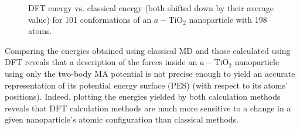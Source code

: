 \documentclass[aps,prb,twocolumn,amsmath,amssymb,superscriptaddress,longbibliography]{revtex4-1}
\newcommand\tab[1][1cm]{\hspace*{#1}} %
\begin{document}
\begin{figure}[htb]
\caption{DFT energy vs. classical energy (both shifted down by their average value) for 101 conformations of an $a-\text{TiO}_2$ nanoparticle with 198 atoms.}
\label{nnp_198}
\end{figure}

\tab Comparing the energies obtained using classical MD and those calculated using DFT reveals that a description of the forces inside an $a-\text{TiO}_2$ nanoparticle using only the two-body MA potential is not precise enough to yield an accurate representation of its potential energy surface (PES) (with respect to its atoms' positions).
Indeed, plotting the energies yielded by both calculation methods reveals that DFT calculation methods are much more sensitive to a change in a given nanoparticle's atomic configuration than classical methods.
\end{document}
